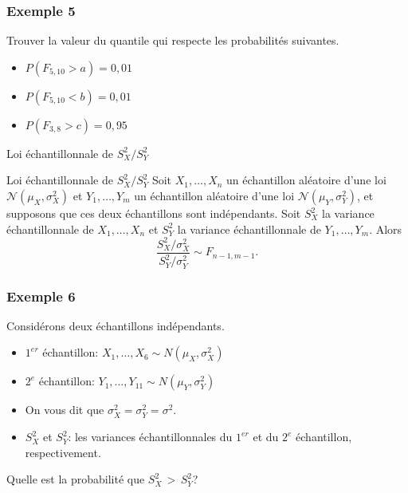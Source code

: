 \documentclass{BeamerTemplate}
\begin{document}
\begin{frame}[t]
 \frametitle{Exemple 5}

Trouver la valeur du quantile qui respecte les probabilités suivantes.
 \begin{itemize}
\item $P(F_{5,10}>a)=0,01$
\vspace{1cm}

\item $P(F_{5,10}<b)=0,01$

\vspace{2cm}
\item $P(F_{3,8}>c)=0,95$

\vspace{2cm}
\end{itemize}
\end{frame}


\begin{frame}{Loi échantillonnale de $S^2_X/S^2_Y$}

   \begin{Boite}{Loi échantillonnale de $S^2_X/S^2_Y$}
    Soit $X_1,\dots,X_{n}$ un échantillon aléatoire d'une loi $\mathcal{N}(\mu_X,\sigma_X^2)$
    et $Y_1,\dots,Y_{m}$ un échantillon aléatoire d'une loi $\mathcal{N}(\mu_Y,\sigma_Y^2)$,
    et supposons que ces deux échantillons sont indépendants. Soit $S^2_X$ la variance
    échantillonnale de $X_1,\dots,X_{n}$ et $S^2_Y$ la variance échantillonnale de $Y_1,\dots,Y_{m}$.
    Alors
    $$\frac{S^2_X/\sigma^2_X}{S^2_Y/\sigma^2_Y}\sim F_{n-1,m-1}.$$
\end{Boite}
 
\end{frame}



\begin{frame}[t]
 \frametitle{Exemple 6}

 {\small
Considérons deux échantillons indépendants.
\begin{itemize}
\item $1^{er}$ échantillon: $X_1,\ldots,X_6\sim N(\mu_X,\sigma_X^2)$ %
\item $2^e$ échantillon: $Y_1,\ldots,Y_{11}\sim N(\mu_Y,\sigma_Y^2)$ %
\item On vous dit que $\sigma^2_X=\sigma^2_Y=\sigma^2$.
\item $S^2_X$ et $S^2_Y$: les variances échantillonnales du $1^{er}$ et du $2^e$ échantillon, respectivement.
\end{itemize}

Quelle est la probabilité que $S^2_X \,>\,S^2_Y$?}

\end{frame}
\end{document}
